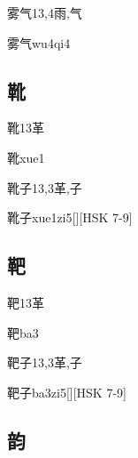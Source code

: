 \begin{Entry}{雾气}{13,4}{⾬,⽓}
  \begin{Phonetics}{雾气}{wu4qi4}
  \end{Phonetics}
\end{Entry}

\subsection*{靴}

\begin{Entry}{靴}{13}{⾰}
  \begin{Phonetics}{靴}{xue1}
  \end{Phonetics}
\end{Entry}

\begin{Entry}{靴子}{13,3}{⾰,⼦}
  \begin{Phonetics}{靴子}{xue1zi5}[][HSK 7-9]
  \end{Phonetics}
\end{Entry}

\subsection*{靶}

\begin{Entry}{靶}{13}{⾰}
  \begin{Phonetics}{靶}{ba3}
  \end{Phonetics}
\end{Entry}

\begin{Entry}{靶子}{13,3}{⾰,⼦}
  \begin{Phonetics}{靶子}{ba3zi5}[][HSK 7-9]
  \end{Phonetics}
\end{Entry}

\subsection*{韵}

